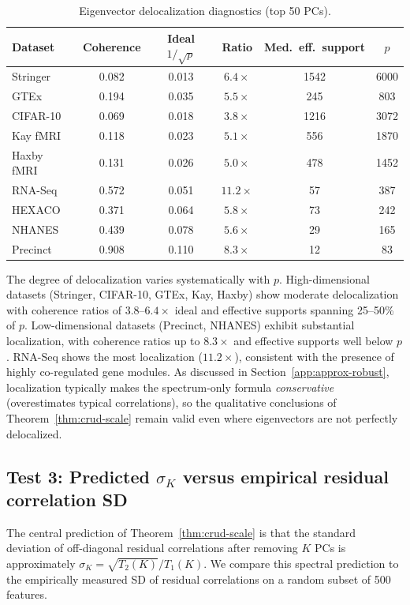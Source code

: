 \begin{table}[h]
\centering
\caption{Eigenvector delocalization diagnostics (top 50 PCs).}
\label{tab:deloc}
\begin{tabular}{lccccc}
\toprule
Dataset & Coherence & Ideal $1/\sqrt{p}$ & Ratio & Med.\ eff.\ support & $p$ \\
\midrule
Stringer    & 0.082 & 0.013 & $6.4\times$ & 1542 & 6000 \\
GTEx        & 0.194 & 0.035 & $5.5\times$ & 245  & 803 \\
CIFAR-10    & 0.069 & 0.018 & $3.8\times$ & 1216 & 3072 \\
Kay fMRI    & 0.118 & 0.023 & $5.1\times$ & 556  & 1870 \\
Haxby fMRI  & 0.131 & 0.026 & $5.0\times$ & 478  & 1452 \\
RNA-Seq     & 0.572 & 0.051 & $11.2\times$ & 57  & 387 \\
HEXACO      & 0.371 & 0.064 & $5.8\times$ & 73   & 242 \\
NHANES      & 0.439 & 0.078 & $5.6\times$ & 29   & 165 \\
Precinct    & 0.908 & 0.110 & $8.3\times$ & 12   & 83  \\
\bottomrule
\end{tabular}
\end{table}

The degree of delocalization varies systematically with $p$.
High-dimensional datasets (Stringer, CIFAR-10, GTEx, Kay, Haxby) show moderate delocalization
with coherence ratios of $3.8$--$6.4\times$ ideal and effective supports spanning
25--50\% of $p$.
Low-dimensional datasets (Precinct, NHANES) exhibit substantial localization, with
coherence ratios up to $8.3\times$ and effective supports well below $p$.
RNA-Seq shows the most localization ($11.2\times$), consistent with the presence of
highly co-regulated gene modules.
As discussed in Section~\ref{app:approx-robust}, localization typically makes the
spectrum-only formula \emph{conservative} (overestimates typical correlations),
so the qualitative conclusions of Theorem~\ref{thm:crud-scale} remain valid even where
eigenvectors are not perfectly delocalized.

\subsection{Test 3: Predicted $\sigma_K$ versus empirical residual correlation SD}

The central prediction of Theorem~\ref{thm:crud-scale} is that the standard deviation
of off-diagonal residual correlations after removing $K$ PCs is approximately
$\sigma_K = \sqrt{T_2(K)}/T_1(K)$.
We compare this spectral prediction to the empirically measured SD of residual
correlations on a random subset of 500 features.

